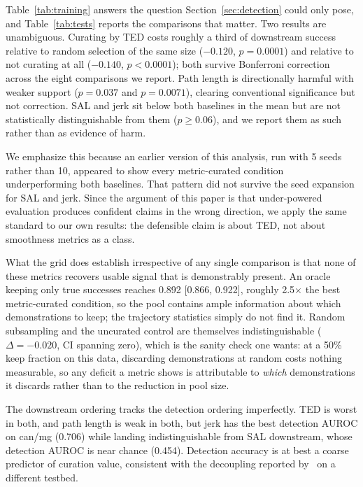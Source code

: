 \documentclass[10pt]{article}
\begin{document}
Table~\ref{tab:training} answers the question Section~\ref{sec:detection}
could only pose, and Table~\ref{tab:tests} reports the comparisons that
matter. Two results are unambiguous. Curating by TED costs roughly a third
of downstream success relative to random selection of the same size
($-0.120$, $p = 0.0001$) and relative to not curating at all ($-0.140$,
$p < 0.0001$); both survive Bonferroni correction across the eight
comparisons we report. Path length is directionally harmful with weaker
support ($p = 0.037$ and $p = 0.0071$), clearing conventional significance
but not correction. SAL and jerk sit below both baselines in the mean but
are not statistically distinguishable from them ($p \geq 0.06$), and we
report them as such rather than as evidence of harm.

We emphasize this because an earlier version of this analysis, run with
5 seeds rather than 10, appeared to show every metric-curated condition
underperforming both baselines. That pattern did not survive the seed
expansion for SAL and jerk. Since the argument of this paper is that
under-powered evaluation produces confident claims in the wrong direction,
we apply the same standard to our own results: the defensible claim is about
TED, not about smoothness metrics as a class.

What the grid does establish irrespective of any single comparison is that
none of these metrics recovers usable signal that is demonstrably present.
An oracle keeping only true successes reaches 0.892 [0.866, 0.922], roughly
2.5$\times$ the best metric-curated condition, so the pool contains ample
information about which demonstrations to keep; the trajectory statistics
simply do not find it. Random subsampling and the uncurated control are
themselves indistinguishable ($\Delta = -0.020$, CI spanning zero), which is
the sanity check one wants: at a 50\% keep fraction on this data, discarding
demonstrations at random costs nothing measurable, so any deficit a metric
shows is attributable to \emph{which} demonstrations it discards rather than
to the reduction in pool size.

The downstream ordering tracks the detection ordering imperfectly. TED is
worst in both, and path length is weak in both, but jerk has the best
detection AUROC on can/mg (0.706) while landing indistinguishable from SAL
downstream, whose detection AUROC is near chance (0.454). Detection accuracy
is at best a coarse predictor of curation value, consistent with the
decoupling reported by~\citep{bedi-policy} on a different testbed.
\end{document}
